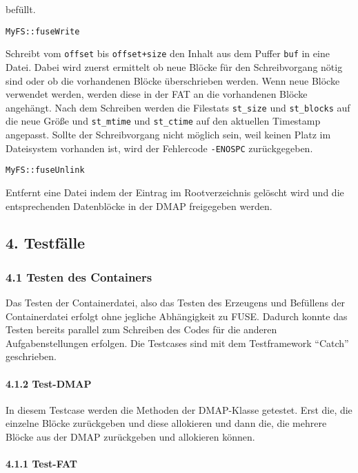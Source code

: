 \documentclass[]{article}
\let\oldparagraph\paragraph
\renewcommand{\paragraph}[1]{\oldparagraph{#1}\mbox{}}
\begin{document}
befüllt.

\texttt{MyFS::fuseWrite}

Schreibt vom \texttt{offset} bis \texttt{offset+size} den Inhalt aus dem
Puffer \texttt{buf} in eine Datei. Dabei wird zuerst ermittelt ob neue
Blöcke für den Schreibvorgang nötig sind oder ob die vorhandenen Blöcke
überschrieben werden. Wenn neue Blöcke verwendet werden, werden diese in
der FAT an die vorhandenen Blöcke angehängt. Nach dem Schreiben werden
die Filestats \texttt{st\_size} und \texttt{st\_blocks} auf die neue
Größe und \texttt{st\_mtime} und \texttt{st\_ctime} auf den aktuellen
Timestamp angepasst. Sollte der Schreibvorgang nicht möglich sein, weil
keinen Platz im Dateisystem vorhanden ist, wird der Fehlercode
\texttt{-ENOSPC} zurückgegeben.

\texttt{MyFS::fuseUnlink}

Entfernt eine Datei indem der Eintrag im Rootverzeichnis gelöscht wird
und die entsprechenden Datenblöcke in der DMAP freigegeben werden.

\hypertarget{testfuxe4lle}{%
\subsection{4. Testfälle}\label{testfuxe4lle}}

\hypertarget{testen-des-containers}{%
\subsubsection{4.1 Testen des Containers}\label{testen-des-containers}}

Das Testen der Containerdatei, also das Testen des Erzeugens und
Befüllens der Containerdatei erfolgt ohne jegliche Abhängigkeit zu FUSE.
Dadurch konnte das Testen bereits parallel zum Schreiben des Codes für
die anderen Aufgabenstellungen erfolgen. Die Testcases sind mit dem
Testframework ``Catch'' geschrieben.

\hypertarget{test-dmap}{%
\paragraph{4.1.2 Test-DMAP}\label{test-dmap}}

In diesem Testcase werden die Methoden der DMAP-Klasse getestet. Erst
die, die einzelne Blöcke zurückgeben und diese allokieren und dann die,
die mehrere Blöcke aus der DMAP zurückgeben und allokieren können.

\hypertarget{test-fat}{%
\paragraph{4.1.1 Test-FAT}\label{test-fat}}
\end{document}
